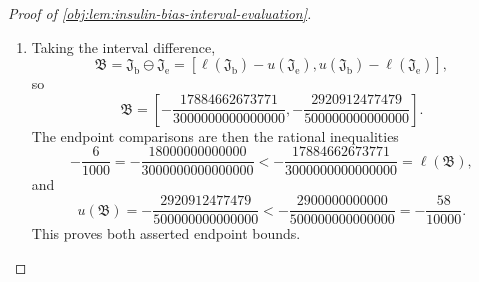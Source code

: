 \documentclass[11pt]{article}
\begin{document}
\begin{proof}[Proof of \cref{obj:lem:insulin-bias-interval-evaluation}]
\begin{enumerate}
\item Taking the interval difference,
\[
\mathfrak B
=
\mathfrak J_{\mathrm b}\ominus\mathfrak J_{\mathrm e}
=
\left[
\ell(\mathfrak J_{\mathrm b})-u(\mathfrak J_{\mathrm e}),
u(\mathfrak J_{\mathrm b})-\ell(\mathfrak J_{\mathrm e})
\right],
\]
so
\[
\mathfrak B
=
\left[
-\frac{17884662673771}{3000000000000000},
-\frac{2920912477479}{500000000000000}
\right].
\]
The endpoint comparisons are then the rational inequalities
\[
-\frac{6}{1000}
=
-\frac{18000000000000}{3000000000000000}
<
-\frac{17884662673771}{3000000000000000}
=
\ell(\mathfrak B),
\]
and
\[
u(\mathfrak B)
=
-\frac{2920912477479}{500000000000000}
<
-\frac{2900000000000}{500000000000000}
=
-\frac{58}{10000}.
\]
This proves both asserted endpoint bounds.
\end{enumerate}
\end{proof}
\end{document}
